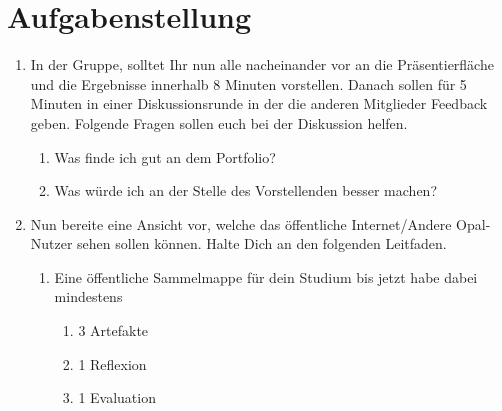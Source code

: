 \documentclass[a4paper,oneside]{scrarticle}
\begin{document}
	\section*{Aufgabenstellung}

	\begin{enumerate}
		\item In der Gruppe, solltet Ihr nun alle nacheinander vor an die Präsentierfläche und die Ergebnisse innerhalb 8 Minuten vorstellen. Danach sollen für 5 Minuten in einer Diskussionsrunde in der die anderen Mitglieder Feedback geben. Folgende Fragen sollen euch bei der Diskussion helfen. 
		\begin{enumerate}
			\item Was finde ich gut an dem Portfolio?
			\item Was würde ich an der Stelle des Vorstellenden besser machen?
		\end{enumerate}
		\item Nun bereite eine Ansicht vor, welche das öffentliche Internet/Andere Opal-Nutzer sehen sollen können. Halte Dich an den folgenden Leitfaden.
		\begin{enumerate}
			\item Eine öffentliche Sammelmappe für dein Studium bis jetzt habe dabei mindestens
			\begin{enumerate}
				\item 3 Artefakte
				\item 1 Reflexion
				\item 1 Evaluation
			\end{enumerate}
		\end{enumerate}

	\end{enumerate}
\end{document}
